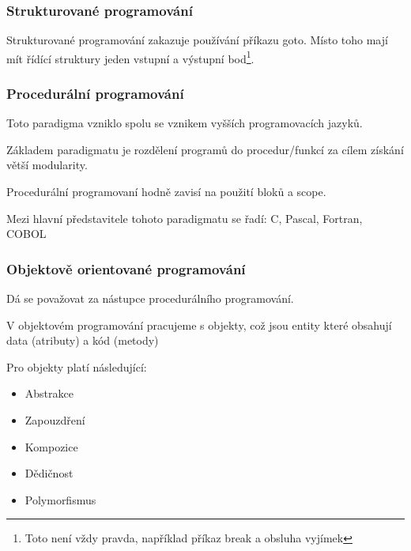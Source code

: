 \begin{frame}
    \frametitle{Strukturované programování}
    Strukturované programování zakazuje používání příkazu goto.
    Místo toho mají mít řídící struktury jeden vstupní a výstupní bod\footnote{Toto není vždy pravda, například příkaz break a obsluha vyjímek}.


\end{frame}


\begin{frame}
    \frametitle{Procedurální programování}
    Toto paradigma vzniklo spolu se vznikem vyšších programovacích jazyků.
    
    Základem paradigmatu je rozdělení programů do procedur/funkcí za cílem získání větší modularity.

    Procedurální programovaní hodně zavisí na použití bloků a scope. %

    Mezi hlavní představitele tohoto paradigmatu se řadí: \break C, Pascal, Fortran, COBOL 


\end{frame}


\begin{frame}
    \frametitle{Objektově orientované programování}
    Dá se považovat za nástupce procedurálního programování. 
    
    V objektovém programování pracujeme s objekty, což jsou entity které obsahují data (atributy) a kód (metody)

    Pro objekty platí následující: %

    \begin{itemize}
        \item Abstrakce
        \item Zapouzdření
        \item Kompozice
        \item Dědičnost
        \item Polymorfismus
    \end{itemize}
    
\end{frame}


